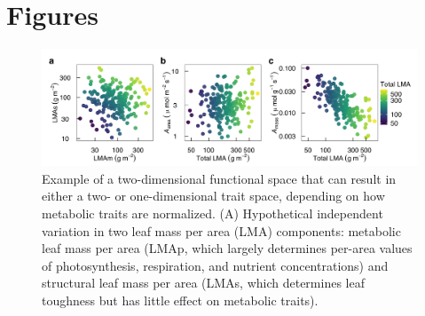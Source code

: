 \documentclass[
  12pt,
]{article}
\providecommand{\DIFaddbeginFL}{} %
\providecommand{\DIFdelbeginFL}{} %
\providecommand{\DIFdelendFL}{} %
\newcommand{\DIFscaledelfig}{0.5}
\newlength{\DIFdelgraphicswidth} %
\newlength{\DIFdelgraphicsheight} %
\newcommand{\DIFaddincludegraphics}[2][]{{\color{blue}\fbox{\DIFOincludegraphics[#1]{#2}}}} %
\newcommand{\DIFdelincludegraphics}[2][]{%
\sbox{\DIFdelgraphicsbox}{\DIFOincludegraphics[#1]{#2}}%
\settoboxwidth{\DIFdelgraphicswidth}{\DIFdelgraphicsbox} %
\settoboxtotalheight{\DIFdelgraphicsheight}{\DIFdelgraphicsbox} %
\scalebox{\DIFscaledelfig}{%
\parbox[b]{\DIFdelgraphicswidth}{\usebox{\DIFdelgraphicsbox}\\[-\baselineskip] \rule{\DIFdelgraphicswidth}{0em}}\llap{\resizebox{\DIFdelgraphicswidth}{\DIFdelgraphicsheight}{%
\setlength{\unitlength}{\DIFdelgraphicswidth}%
\begin{picture}(1,1)%
\thicklines\linethickness{2pt} %
{\color[rgb]{1,0,0}\put(0,0){\framebox(1,1){}}}%
{\color[rgb]{1,0,0}\put(0,0){\line( 1,1){1}}}%
{\color[rgb]{1,0,0}\put(0,1){\line(1,-1){1}}}%
\end{picture}%
}\hspace*{3pt}}} %
} %
\DeclareRobustCommand{\DIFaddbeginFL}{\DIFOaddbeginFL \let\includegraphics\DIFaddincludegraphics} %
\DeclareRobustCommand{\DIFdelbeginFL}{\DIFOdelbeginFL \let\includegraphics\DIFdelincludegraphics} %
\DeclareRobustCommand{\DIFdelendFL}{\DIFOaddendFL \let\includegraphics\DIFOincludegraphics} %
\begin{document}
\newpage

\hypertarget{figures}{%
\section{Figures}\label{figures}}

\begin{figure}
\DIFdelbeginFL %
\DIFdelendFL \DIFaddbeginFL \hypertarget{fig:Hplt}{%
\centering
\includegraphics{../figs/fig_h3.png}
\caption{Example of a two-dimensional functional space that can result in either a two- or one-dimensional trait space, depending on how metabolic traits are normalized. (A) Hypothetical independent variation in two leaf mass per area (LMA) components: metabolic leaf mass per area (LMAp, which largely determines per-area values of photosynthesis, respiration, and nutrient concentrations) and structural leaf mass per area (LMAs, which determines leaf toughness but has little effect on metabolic traits).
}}
\end{figure}
\end{document}
